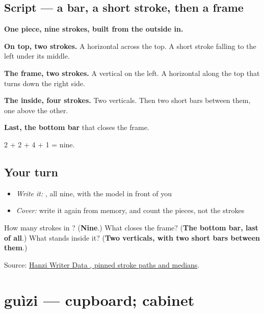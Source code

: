 \subsection*{Script — a bar, a short stroke, then a frame}

\begin{quote}
\end{quote}

\textbf{One piece, nine strokes, built from the outside in.}

\textbf{On top, two strokes.} A horizontal across the top. A short stroke falling to the left under its middle.

\textbf{The frame, two strokes.} A vertical on the left. A horizontal along the top that turns down the right side.

\textbf{The inside, four strokes.} Two verticals. Then two short bars between them, one above the other.

\textbf{Last, the bottom bar} that closes the frame.

2 + 2 + 4 + 1 = nine.

\subsection*{Your turn}
\begin{itemize}
\raggedright
  \item \emph{Write it:} , all nine, with the model in front of you
  \item \emph{Cover:} write it again from memory, and count the pieces, not the strokes
\end{itemize}

\begin{tcolorbox}[breakable,colback=teal!4,colframe=teal!35!black,title={Before you move on}]
How many strokes in ? (\textbf{Nine}.) What closes the frame? (\textbf{The bottom bar, last of all}.) What stands inside it? (\textbf{Two verticals, with two short bars between them}.)

Source: \href{https://raw.githubusercontent.com/chanind/hanzi-writer-data/68d10a4b21150cae5e1ebbd223eed289cf32d90c/data/\%E9\%9D\%A2.json}{Hanzi Writer Data , pinned stroke paths and medians}.
\end{tcolorbox}
\section[guìzi]{guìzi — cupboard; cabinet}

